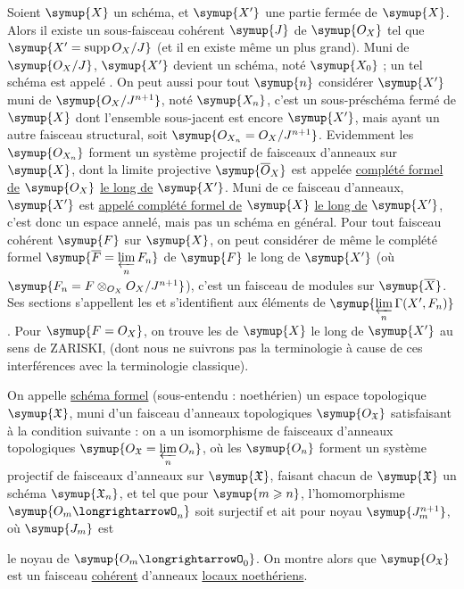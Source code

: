 Soient $\symup{X}$ un schéma, et $\symup{X'}$ une partie fermée de $\symup{X}$. Alors il existe un
sous-faisceau cohérent $\symup{J}$ de $\symup{O_X}$ tel que
$\symup{X'=\operatorname{supp}O_X/J}$ (et il en existe même un plus grand). Muni
de $\symup{O_X/J}$, $\symup{X'}$ devient un schéma, noté $\symup{X_0}$ ; un tel schéma est appelé
. On peut aussi pour tout $\symup{n}$ considérer $\symup{X'}$ muni
de $\symup{O_X/J^{n+1}}$, noté $\symup{X_n}$, c'est un sous-préschéma fermé de $\symup{X}$ dont
l'ensemble sous-jacent est encore $\symup{X'}$, mais ayant un autre faisceau
structural, soit $\symup{O_{X_n}=O_X/J^{n+1}}$. Evidemment les $\symup{O_{X_n}}$
forment un système projectif de faisceaux d'anneaux sur $\symup{X}$, dont la limite
projective $\symup{\overline{O}_X}$ est appelée \uline{complété formel de} $\symup{O_X}$ \uline{le
long de} $\symup{X'}$. Muni de ce faisceau d'anneaux, $\symup{X'}$ est \uline{appelé
complété formel de} $\symup{X}$ \uline{le long de} $\symup{X'}$, c'est donc un espace annelé,
mais pas un schéma en général. Pour tout faisceau cohérent $\symup{F}$ sur $\symup{X}$, on peut
considérer de même le complété formel
$\symup{\overline F=\varprojlim\limits_n F_n}$ de $\symup{F}$ le long de $\symup{X'}$ (où
$\symup{F_n=F\otimes_{O_X}O_X/J^{n+1}}$), c'est un faisceau de modules sur
$\symup{\overline X}$. Ses sections s'appellent les  et s'identifient aux éléments de
$\symup{\varprojlim\limits_n\Gamma(X',F_n)}$. Pour $\symup{F=O_X}$, on trouve les  de $\symup{X}$ le long de $\symup{X'}$ au sens de ZARISKI, (dont nous ne suivrons
pas la terminologie à cause de ces interférences avec la terminologie
classique).

On appelle \uline{schéma formel} (sous-entendu : noethérien) un espace
topologique $\symup{\mathfrak X}$, muni d'un faisceau d'anneaux topologiques
$\symup{O_{\mathfrak X}}$ satisfaisant à la condition suivante : on a un
isomorphisme de faisceaux d'anneaux topologiques
$\symup{O_{\mathfrak X}=\varprojlim\limits_nO_n}$, où les $\symup{O_n}$ forment un système
projectif de faisceaux d'anneaux sur $\symup{\mathfrak X}$, faisant chacun de
$\symup{\mathfrak X}$ un schéma $\symup{\mathfrak X_n}$, et tel que pour $\symup{m\geqslant n}$,
l'homomorphisme $\symup{O_m\longrightarrowO_n}$ soit surjectif et ait pour noyau
$\symup{J_m^{n+1}}$, où $\symup{J_m}$ est

le noyau de $\symup{O_m\longrightarrowO_0}$. On montre alors que
$\symup{O_{\mathfrak X}}$ est un faisceau \uline{cohérent} d'anneaux \uline{locaux
noethériens}.

